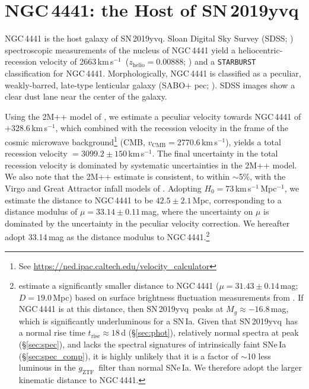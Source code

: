 \documentclass[twocolumn]{aastex63}
\newcommand{\fromkate}[1]{{\color{brown} fromKM: {#1}}}
\newcommand{\todo}[1]{{\color{magenta} to-do: {#1}}}
\newcommand{\gztf}{$g_\mathrm{ZTF}$}
\newcommand{\kms}{km\,s$^{-1}$}
\newcommand{\sn}{SN\,2019yvq}
\begin{document}
\section{NGC\,4441: the Host of \sn}\label{sec:host}

NGC\,4441 is the host galaxy of \sn. Sloan Digital Sky Survey (SDSS;
\citealt{York00}) spectroscopic measurements of the nucleus of NGC\,4441
yield a heliocentric-recession velocity of 2663\,\kms\ ($z_\mathrm{helio} =
0.00888$; \citealt{Abolfathi18}) and a \texttt{STARBURST} classification for
NGC\,4441. Morphologically, NGC\,4441 is classified as a peculiar,
weakly-barred, late-type lenticular galaxy (SABO$+$ pec;
\citealt{de-Vaucouleurs91}). SDSS images show a clear dust lane near the
center of the galaxy.

Using the 2M++ model of \citet{Carrick15}, we estimate a peculiar velocity
towards NGC\,4441 of $+328.6$\,\kms, which combined with the recession
velocity in the frame of the cosmic microwave background\footnote{See
\url{https://ned.ipac.caltech.edu/velocity_calculator}} (CMB, $v_\mathrm{CMB}
= 2770.6$\,\kms), yields a total recession velocity $= 3099.2 \pm 150$\,\kms.
The final uncertainty in the total recession velocity is dominated by
systematic uncertainties in the 2M++ model. We also note that the 2M++
estimate is consistent, to within $\sim$5\%, with the Virgo and Great
Attractor infall models of \citet{Mould00}. Adopting $H_0 =
73$\,\kms\,Mpc$^{-1}$, we estimate the distance to NGC\,4441 to be $42.5 \pm
2.1$\,Mpc, corresponding to a distance modulus of $\mu = 33.14 \pm 0.11$\,mag,
where the uncertainty on $\mu$ is dominated by the uncertainty in the peculiar
velocity correction. We hereafter adopt 33.14\,mag as the distance modulus to
NGC\,4441.\footnote{\citet{Tully13} estimate a significantly smaller distance
to NGC\,4441 ($\mu = 31.43 \pm 0.14$\,mag; $D = 19.0$\,Mpc) based on surface
brightness fluctuation measurements from \citet{Tonry01}. If NGC\,4441 is at
this distance, then \sn\ peaks at $M_g \approx -16.8$\,mag, which is
significantly underluminous for a SN\,Ia. Given that \sn\ has a normal rise
time $t_\mathrm{rise} \approx 18$\,d (\S\ref{sec:phot}), relatively normal
spectra at peak (\S\ref{sec:spec}), and lacks the spectral signatures of
intrinsically faint SNe\,Ia (\S\ref{sec:spec_comp}), it is highly unlikely
that it is a factor of $\sim$10 less luminous in the \gztf\ filter than normal
SNe\,Ia. We therefore adopt the larger kinematic distance to NGC\,4441.}
\end{document}

